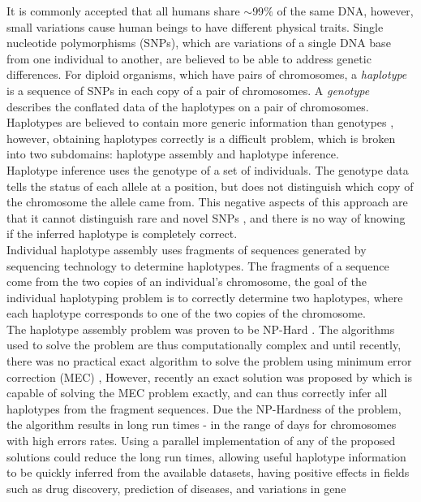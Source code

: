 \documentclass[10pt,twocolumn]{witseiepaper}
\begin{document}
It is commonly accepted that all humans share $\mathtt{\sim}$99$\%$ of the same DNA, however, small variations 
cause human beings to have different physical traits. Single nucleotide polymorphisms (SNPs), which are
variations of a single DNA base from one individual to another, are believed to be able to address
genetic differences. For diploid organisms, which have pairs of chromosomes, a \textit{haplotype} is a 
sequence of SNPs in each copy of a pair of chromosomes. A \textit{genotype} describes the conflated data of the
haplotypes on a pair of chromosomes. Haplotypes are believed to contain more generic information than
genotypes \cite{stephens:2001}, however, obtaining haplotypes correctly is a difficult problem, which is 
broken into two subdomains: haplotype assembly and haplotype inference. \\
Haplotype inference uses the genotype of a set of individuals. The genotype data tells the status of each
allele at a position, but does not distinguish which copy of the chromosome the allele came from.
This negative aspects of this approach are that it cannot distinguish rare and novel SNPs \cite{he:2010}, 
and there is no way of knowing if the inferred haplotype is completely correct. \\
Individual haplotype assembly uses fragments of sequences generated by sequencing technology to determine
haplotypes. The fragments of a sequence come from the two copies of an individual's chromosome, the goal of the
individual haplotyping problem is to correctly determine two haplotypes, where each haplotype corresponds to
one of the two copies of the chromosome. \\
The haplotype assembly problem was proven to be NP-Hard \cite{lippert:2002}. The algorithms used to solve the
problem are thus computationally complex and until recently, there was no practical exact algorithm to solve 
the problem using minimum error correction (MEC) \cite{bonizzoni:2003},
However, recently an exact solution was proposed by \cite{chen:2013} which is capable of solving the MEC 
problem exactly, and can thus correctly infer all haplotypes from the fragment sequences. Due the NP-Hardness 
of the problem, the algorithm results in long run times - in the range of days for chromosomes with high
errors rates. Using a parallel implementation of any of the proposed solutions could reduce the long run
times, allowing useful haplotype information to be quickly inferred from the available datasets, having
positive effects in fields such as drug discovery, prediction of diseases, and variations in gene
\end{document}
